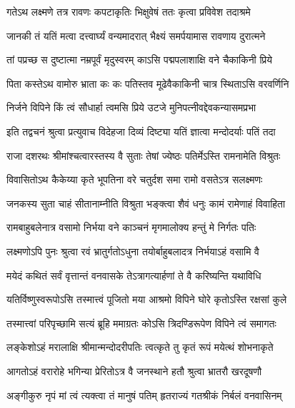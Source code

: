 \twolineshloka
{गतेऽथ लक्ष्मणे तत्र रावणः कपटाकृतिः}
{भिक्षुवेषं ततः कृत्वा प्रविवेश तदाश्रमे}%

\twolineshloka
{जानकी तं यतिं मत्वा दत्त्वार्घ्यं वन्यमादरात्}
{भैक्ष्यं समर्पयामास रावणाय दुरात्मने}%

\twolineshloka
{तां पप्रच्छ स दुष्टात्मा नम्रपूर्वं मृदुस्वरम्}
{काऽसि पद्मपलाशाक्षि वने चैकाकिनी प्रिये}%

\twolineshloka
{पिता कस्तेऽथ वामोरु भ्राता कः कः पतिस्तव}
{मूढेवैकाकिनी चात्र स्थिताऽसि वरवर्णिनि}%

\twolineshloka
{निर्जने विपिने किं त्वं सौधार्हा त्वमसि प्रिये}
{उटजे मुनिपत्‍नीवद्देवकन्यासमप्रभा}%



\twolineshloka
{इति तद्वचनं श्रुत्वा प्रत्युवाच विदेहजा}
{दिव्यं दिष्ट्या यतिं ज्ञात्वा मन्दोदर्याः पतिं तदा}%

\twolineshloka
{राजा दशरथः श्रीमांश्चत्वारस्तस्य वै सुताः}
{तेषां ज्येष्ठः पतिर्मेऽस्ति रामनामेति विश्रुतः}%

\twolineshloka
{विवासितोऽथ कैकेय्या कृते भूपतिना वरे}
{चतुर्दश समा रामो वसतेऽत्र सलक्ष्मणः}%

\twolineshloka
{जनकस्य सुता चाहं सीतानाम्नीति विश्रुता}
{भङ्क्त्वा शैवं धनुः कामं रामेणाहं विवाहिता}%

\twolineshloka
{रामबाहुबलेनात्र वसामो निर्भया वने}
{काञ्चनं मृगमालोक्य हन्तुं मे निर्गतः पतिः}%

\twolineshloka
{लक्ष्मणोऽपि पुनः श्रुत्वा रवं भ्रातुर्गतोऽधुना}
{तयोर्बाहुबलादत्र निर्भयाऽहं वसामि वै}%

\twolineshloka
{मयेदं कथितं सर्वं वृत्तान्तं वनवासके}
{तेऽत्रागत्यार्हणां ते वै करिष्यन्ति यथाविधि}%

\twolineshloka
{यतिर्विष्णुस्वरूपोऽसि तस्मात्त्वं पूजितो मया}
{आश्रमो विपिने घोरे कृतोऽस्ति रक्षसां कुले}%

\twolineshloka
{तस्मात्त्वां परिपृच्छामि सत्यं ब्रूहि ममाग्रतः}
{कोऽसि त्रिदण्डिरूपेण विपिने त्वं समागतः}%




\twolineshloka
{लङ्केशोऽहं मरालाक्षि श्रीमान्मन्दोदरीपतिः}
{त्वत्कृते तु कृतं रूपं मयेत्थं शोभनाकृते}%

\twolineshloka
{आगतोऽहं वरारोहे भगिन्या प्रेरितोऽत्र वै}
{जनस्थाने हतौ श्रुत्वा भ्रातरौ खरदूषणौ}%

\twolineshloka
{अङ्गीकुरु नृपं मां त्वं त्यक्त्वा तं मानुषं पतिम्}
{हृतराज्यं गतश्रीकं निर्बलं वनवासिनम्}%

